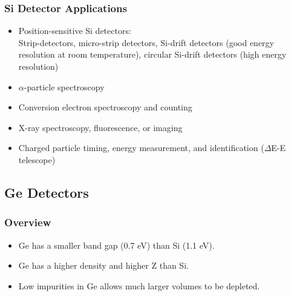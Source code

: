 \subsubsection{Si Detector Applications}
\begin{itemize}
    \item Position-sensitive Si detectors:\\
    Strip-detectors, micro-strip detectors, Si-drift detectors (good energy resolution at room temperature), circular Si-drift detectors (high energy resolution)
    \item $\alpha$-particle spectroscopy
    \item Conversion electron spectroscopy and counting
    \item X-ray spectroscopy, fluorescence, or imaging
    \item Charged particle timing, energy measurement, and identification ($\Delta$E-E telescope)
\end{itemize}

\subsection{Ge Detectors}
\subsubsection{Overview}
\begin{itemize}
    \item Ge has a smaller band gap (0.7 eV) than Si (1.1 eV).
    \item Ge has a higher density and higher Z than Si.
    \item Low impurities in Ge allows much larger volumes to be depleted.
\end{itemize}

